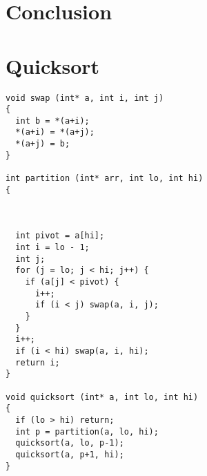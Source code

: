 \documentclass[11pt,openany]{article}
\begin{document}
		
\section{Conclusion}


\appendix
\section*{Quicksort}
\begin{lstlisting}
void swap (int* a, int i, int j)
{
  int b = *(a+i);
  *(a+i) = *(a+j);
  *(a+j) = b;
}

int partition (int* arr, int lo, int hi)
{



  int pivot = a[hi];
  int i = lo - 1;
  int j;
  for (j = lo; j < hi; j++) {
    if (a[j] < pivot) {
      i++;
      if (i < j) swap(a, i, j);
    }
  }
  i++;
  if (i < hi) swap(a, i, hi);
  return i;
}

void quicksort (int* a, int lo, int hi)
{
  if (lo > hi) return;
  int p = partition(a, lo, hi);
  quicksort(a, lo, p-1);
  quicksort(a, p+1, hi);
}

		\end{lstlisting}
\end{document}
